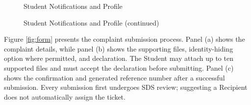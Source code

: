 \renewcommand{\thefigure}{5.6}
\begin{figure}[htbp]
    \centering
    \begin{minipage}[t]{0.43\linewidth}
        \centering
        \vspace{0pt}
        \par{}\par
    \end{minipage}\hspace{0.04\linewidth}
    \begin{minipage}[t]{0.43\linewidth}
        \centering
        \vspace{0pt}
        \par{}\par
    \end{minipage}
    \caption{Student Notifications and Profile}
    \label{fig:sprofile}
\end{figure}
\FloatBarrier

\begin{figure}[htbp]
    \ContinuedFloat
    \centering
    \begin{minipage}[t]{0.43\linewidth}
        \centering
        \vspace{0pt}
        \par{}\par
    \end{minipage}
    \caption[]{Student Notifications and Profile (continued)}
\end{figure}
\FloatBarrier

Figure \ref{fig:form} presents the complaint submission process. Panel (a) shows the complaint details, while panel (b) shows the supporting files, identity-hiding option where permitted, and declaration. The Student may attach up to ten supported files and must accept the declaration before submitting. Panel (c) shows the confirmation and generated reference number after a successful submission. Every submission first undergoes SDS review; suggesting a Recipient does not automatically assign the ticket.

